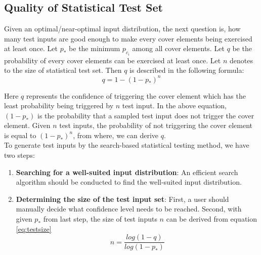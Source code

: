 \documentclass[journal]{IEEEtran}
\begin{document}



\subsection{Quality of Statistical Test Set} Given an optimal/near-optimal input distribution, the next question is, how many test inputs are good enough to make every cover elements being exercised at least once. Let \(p_*\) be the minimum \(p_{c_{i}}\) among all cover elements. Let \(q\) be the probability of every cover elements can be exercised at least once. Let \(n\) denotes to the size of statistical test set. Then \(q\) is described in the following formula: 
\[\tag{6}\label{eq:testsize}q = 1-(1-p_{*})^n\]

Here \(q\) represents the confidence of triggering the cover element which has the least probability being triggered by \(n\) test input. In the above equation, \((1-p_{*})\) is the probability that a sampled test input does not trigger the cover element. Given \(n\) test inputs, the probability of not triggering the cover element is equal to \((1-p_{*})^n\), from where, we can derive \(q\).\\

To generate test inputs by the search-based statistical testing method, we have two steps:
\begin{enumerate}
	\item \textbf{Searching for a well-suited input distribution}: An efficient search algorithm should be conducted to find the well-suited input distribution. 
	\item \textbf{Determining the size of the test input set}: First, a user should manually decide what confidence level needs to be reached. Second, with given \(p_{*}\) from last step, the size of test inputs \(n\) can be derived from equation \ref{eq:testsize} 
	\[n = \frac{log(1-q)}{log(1-p_{*})}\] 
\end{enumerate}
\end{document}
